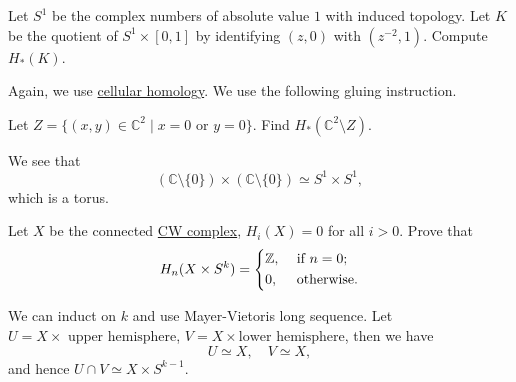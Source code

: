 \begin{exercise}[QR May 2017]
	Let \(S^1\) be the complex numbers of absolute value \(1\) with induced topology. Let \(K\) be the quotient of \(S^1 \times [0, 1]\) by identifying \((z, 0)\) with \((z^{-2}, 1 )\). Compute \(H_\ast (K)\).
\end{exercise}
\begin{answer}
	Again, we use \hyperref[def:cellular-homology-group]{cellular homology}. We use the following gluing instruction.
	\begin{figure}[H]
		\centering
		\label{fig:ans:ex-3:lec-40}
	\end{figure}
\end{answer}

\begin{exercise}[QR Sep. 2016]
	Let \(Z= \{(x, y)\in \mathbb{C} ^{2} \mid x = 0 \text{ or } y = 0\}\). Find \(H_\ast (\mathbb{C} ^{2} \setminus Z)\).
\end{exercise}
\begin{answer}
	We see that
	\[
		(\mathbb{C} \setminus \{0\})\times (\mathbb{C} \setminus \{0\}) \simeq S^1 \times S^1,
	\]
	which is a torus.
\end{answer}

\begin{exercise}[QR May 2017]
	Let \(X\) be the connected \hyperref[def:CW-Complex]{CW complex}, \(H_i(X) = 0\) for all \(i > 0\). Prove that
	\[
		H_n(X \times S^k) = \begin{dcases}
			\mathbb{Z}, & \text{ if } n = 0; \\
			0,          & \text{ otherwise}.
		\end{dcases}
	\]
\end{exercise}
\begin{answer}
	We can induct on \(k\) and use Mayer-Vietoris long sequence. Let \(U = X \times \text{ upper hemisphere}\), \(V = X \times \text{lower hemisphere}\), then we have
	\[
		U\simeq X,\quad V\simeq X,
	\]
	and hence \(U \cap V \simeq X \times S^{k-1}\).
\end{answer}
